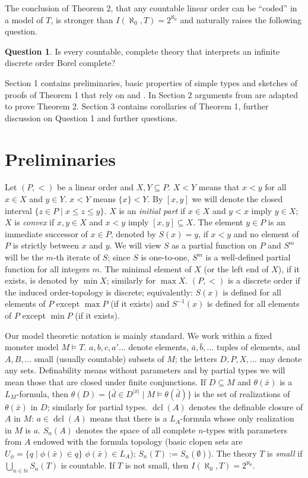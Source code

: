 \documentclass[12pt]{amsart}
\theoremstyle{definition}
\newtheorem{Question}{Question}
\DeclareMathOperator{\dcl}{dcl}
\begin{document}
\smallskip
The conclusion of Theorem 2, that any countable linear order can be ``coded'' in a model of $T$, is stronger than $I(\aleph_0,T)=2^{\aleph_0}$ and 
naturally raises the following question.
 

\begin{Question}
Is every  countable, complete theory that interprets an infinite discrete order Borel complete?
\end{Question}

Section 1 contains preliminaries, basic properties of simple types and sketches of proofs of Theorem 1 that rely on \cite{Sh} and \cite{T}. In Section 2 arguments from \cite{DI} are adapted to prove Theorem 2. Section 3 contains corollaries of Theorem 1, further  discussion on Question 1 and further questions.   


\section{Preliminaries}

Let $(P,<)$ be a linear order and $X,Y\subseteq P$. $X<Y$ means that $x<y$ for all $x\in X$ and $y\in Y$.
$x<Y$ means  $\{x\}<Y$.  By $[x,y]$ we will denote the closed interval $\{z\in P\mid x\leq z\leq y\}$.  $X$ is an {\it initial part} if $x\in X$ and $y<x$ imply $y\in X$; $X$ is {\it convex} if $x,y\in X$ and $x<y$ imply $[x,y]\subseteq X$.
The element $y\in P$ is an immediate successor of $x\in P$, denoted by $S(x)=y$, if $x<y$ and no element of $P$ is strictly between $x$ and $y$. We will view $S$ as a partial function on $P$ and $S^m$ will be the $m$-th iterate of $S$; since $S$ is one-to-one, $S^m$ is a well-defined partial function for all  integers $m$. The minimal element of $X$ (or the left end of $X$), if it exists, is denoted by $\min X$; similarly for $\max X$. $(P,<)$ is a discrete order if the induced order-topology is discrete; equivalently: $S(x)$ is defined for all elements of $P$ except $\max P$ (if it exists) and  $S^{-1}(x)$ is defined for all elements of $P$ except $\min P$ (if it exists). 

Our model theoretic notation is mainly standard. 
We work within a fixed  monster model $M\models T$.  $a,b,c,a'...$ denote elements,  $\bar a,\bar b,...$ tuples of elements, and $A,B,...$ small (usually countable)  subsets of $M$; the letters $D,P,X,...$ may denote  any sets. Definability means without parameters and by partial types we will mean those that are closed under finite conjunctions. If $D\subseteq M$ and $\theta(\bar x)$ is a $L_M$-formula,  then  
 $\theta(D)=\{\bar d\in D^{|\bar x|}\mid M\models \theta(\bar d)\}$ is the set of realizations of  $\theta(\bar x)$ in $D$; similarly for partial  types. $\dcl(A)$ denotes the definable closure of $A$ in $M$: $a\in\dcl(A)$ means that there is a $L_A$-formula whose only realization in $M$ is $a$.  
$S_n(A)$ denotes the space of all complete $n$-types with parameters from $A$ endowed with the formula topology (basic clopen sets are $U_{\phi}=\{q\mid \phi(\bar x)\in q\}$ $\phi(\bar x)\in L_A$); 
$S_n(T):=S_n(\emptyset)$). The theory $T$ is {\it small} if   $\bigcup_{n\in\mathbb N}S_n(T)$ is countable. If $T$ is not small,  then  $I(\aleph_0,T)=2^{\aleph_0}$. 
\end{document}
